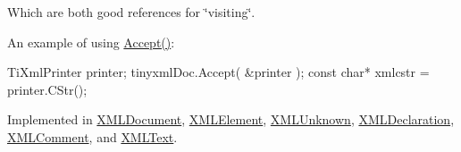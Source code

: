 Which are both good references for \char`\"{}visiting\char`\"{}.

An example of using \hyperlink{classtinyxml2_1_1_x_m_l_node_a22a4129c1b347686a3579664d9278cce}{Accept()}\-: \begin{DoxyVerb}TiXmlPrinter printer;
tinyxmlDoc.Accept( &printer );
const char* xmlcstr = printer.CStr();
\end{DoxyVerb}
 

Implemented in \hyperlink{classtinyxml2_1_1_x_m_l_document_a66d46e7527ec62912b49400b27137eba}{X\-M\-L\-Document}, \hyperlink{classtinyxml2_1_1_x_m_l_element_a66d46e7527ec62912b49400b27137eba}{X\-M\-L\-Element}, \hyperlink{classtinyxml2_1_1_x_m_l_unknown_a66d46e7527ec62912b49400b27137eba}{X\-M\-L\-Unknown}, \hyperlink{classtinyxml2_1_1_x_m_l_declaration_a66d46e7527ec62912b49400b27137eba}{X\-M\-L\-Declaration}, \hyperlink{classtinyxml2_1_1_x_m_l_comment_a66d46e7527ec62912b49400b27137eba}{X\-M\-L\-Comment}, and \hyperlink{classtinyxml2_1_1_x_m_l_text_a66d46e7527ec62912b49400b27137eba}{X\-M\-L\-Text}.

